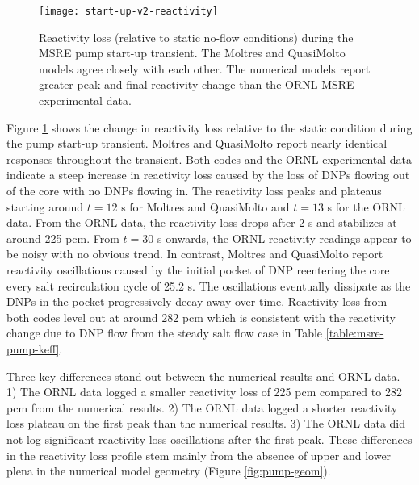 \begin{figure}[t]
  \centering
  \texttt{[image: start-up-v2-reactivity]}
  \caption{Reactivity loss (relative to static no-flow conditions) during the \gls{MSRE} pump
  start-up transient. The Moltres and QuasiMolto models agree closely with each other. The
  numerical models report greater peak and final reactivity change than the \gls{ORNL} \gls{MSRE}
  experimental data.}
  \label{fig:start-up-reactivity}
\end{figure}

Figure \ref{fig:start-up-reactivity} shows the change in reactivity loss relative to the static
condition during the pump start-up transient. Moltres and QuasiMolto report nearly identical
responses throughout the transient. Both codes and the \gls{ORNL} experimental data indicate a
steep increase in reactivity loss caused by the loss of \glspl{DNP} flowing out of the core with no
\glspl{DNP} flowing in. The reactivity loss peaks and plateaus starting around $t=12$ s for Moltres
and QuasiMolto and $t=13$ s for the \gls{ORNL} data. From the \gls{ORNL} data, the reactivity loss
drops after 2 s and stabilizes at around 225 pcm. From $t=30$ s onwards, the \gls{ORNL} reactivity
readings appear to be noisy with no obvious trend. In contrast, Moltres and
QuasiMolto report reactivity oscillations caused by the initial pocket of \gls{DNP} reentering the
core every salt recirculation cycle of 25.2 s. The oscillations eventually dissipate as the
\glspl{DNP} in the pocket progressively decay away over time. Reactivity loss from both codes
level out at around 282 pcm which is consistent with the reactivity change due to \gls{DNP} flow
from the steady salt flow case in Table \ref{table:msre-pump-keff}.

Three key differences stand out between the numerical results and \gls{ORNL} data. 1) The
\gls{ORNL} data logged a smaller reactivity loss of 225 pcm compared to 282 pcm from the
numerical results. 2) The \gls{ORNL} data logged a shorter reactivity loss plateau on the first
peak than the numerical results. 3) The \gls{ORNL} data did not log significant reactivity loss
oscillations after the first peak. These differences in the reactivity loss profile stem mainly
from the absence of upper and lower plena in the numerical model geometry (Figure
\ref{fig:pump-geom}).

